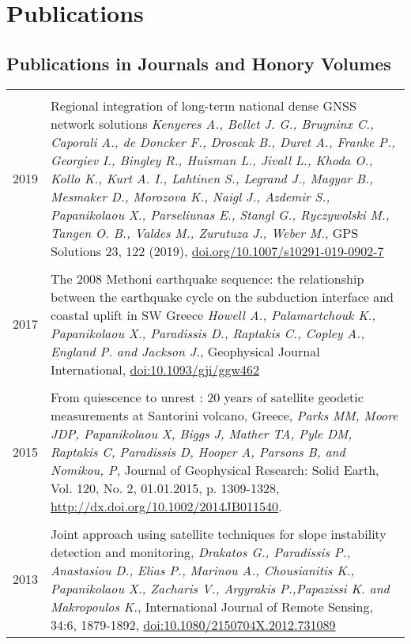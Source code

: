\documentclass[9pt]{extarticle} %
\begin{document}
\section{Publications}
\medskip
%
\subsection*{Publications in Journals and Honory Volumes}
%
\begin{longtable}{r|p{14cm}}
%
\multicolumn{2}{c}{} \\
  \textsc{2019}
%
  & Regional integration of long-term national dense GNSS network solutions
  \emph{Kenyeres A., Bellet J. G., Bruyninx C., Caporali A., de Doncker F., Droscak B., Duret A., Franke P., Georgiev I., Bingley R., Huisman L., Jivall L., Khoda O., Kollo K., Kurt A. I., Lahtinen S., Legrand J., Magyar B., Mesmaker D., Morozova K., Naigl J., Azdemir S., Papanikolaou X., Parseliunas E., Stangl G., Ryczywolski M., Tangen O. B., Valdes M., Zurutuza J., Weber M.}, GPS Solutions 23, 122 (2019), \href{https://doi.org/10.1007/s10291-019-0902-7}{doi.org/10.1007/s10291-019-0902-7}\\
%
\multicolumn{2}{c}{} \\
  \textsc{2017}
%
  & The 2008 Methoni earthquake sequence: the relationship between the earthquake cycle on the subduction interface and coastal uplift in SW Greece
  \emph{Howell A., Palamartchouk K., Papanikolaou X., Paradissis D., Raptakis C., Copley A., England P. and Jackson J.}, Geophysical Journal International, \href{https://doi.org/10.1093/gji/ggw462}{doi:10.1093/gji/ggw462}\\
%
\multicolumn{2}{c}{} \\
  \textsc{2015}
%
  & From quiescence to unrest : 20 years of satellite geodetic measurements at Santorini volcano, Greece,
  \emph{Parks MM, Moore JDP, Papanikolaou X, Biggs J, Mather TA, Pyle DM, Raptakis C, Paradissis D, Hooper A, Parsons B, and Nomikou, P}, Journal of Geophysical Research: Solid Earth, Vol. 120, No. 2, 01.01.2015, p. 1309-1328, \href{http://dx.doi.org/10.1002/2014JB011540}{http://dx.doi.org/10.1002/2014JB011540}.\\
%  
\multicolumn{2}{c}{} \\ 
  \textsc{2013}
%
  & Joint approach using satellite techniques for slope instability detection and monitoring,
  \emph{Drakatos G., Paradissis P., Anastasiou D., Elias P., Marinou A., Chousianitis K., Papanikolaou X., Zacharis V., Argyrakis P.,Papazissi K. and Makropoulos K.},
  International Journal of Remote Sensing, 34:6, 1879-1892, \href{http://www.tandfonline.com/doi/abs/10.1080/2150704X.2012.731089#.Uxni9meIaig}{doi:10.1080/2150704X.2012.731089}\\

\end{longtable}
\end{document}
